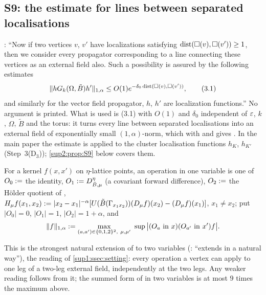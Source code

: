 
\subsection{S9: the estimate \cite[(3.1)]{Ba3} for lines between separated localisations}\label{sup2:ssec:S9}

\cite[p.~432]{Ba3}: ``Now if two vertices $v$, $v'$ have localizations satisfying $\operatorname{dist}(\square(v),\square(v'))\ge1$, then we consider every propagator corresponding to a line connecting these vertices as an external field also. Such a possibility is assured by the following estimates
\[
\lVert hG_k(\Omega,\tilde B)h'\rVert_{1,\alpha}\le O(1)e^{-\delta_0\operatorname{dist}(\square(v),\square(v'))},\tag{3.1}
\]
and similarly for the vector field propagator, $h$, $h'$ are localization functions.'' No argument is printed. What is used is (3.1) with $O(1)$ and $\delta_0$ independent of $\varepsilon$, $k$, $\Omega$, $\tilde B$ and the torus: it turns every line between separated localisations into an external field of exponentially small $(1,\alpha)$-norm, which with \cite[(2.5)]{Ba3} and \cite[(3.2)]{Ba3} gives \cite[(1.33)]{Ba3}. In the main paper the estimate is applied to the cluster localisation functions $h_K$, $h_{K'}$ (Step~3(D$_3$)); \cref{sup2:prop:S9} below covers them.

\begin{definition}\label{sup2:def:S9norm}
For a kernel $f(x,x')$ on $\eta$-lattice points, an operation in one variable is one of $O_0:=$ the identity, $O_1:= D^\eta_{\tilde B,\mu}$ (a covariant forward difference), $O_2:=$ the H\"older quotient of \cite[(1.32)]{Ba3}, $H_\mu f(x_1,x_2):=|x_2-x_1|^{-\alpha}[U(\tilde B(\Gamma_{x_1x_2}))(D_\mu f)(x_2)-(D_\mu f)(x_1)]$, $x_1\ne x_2$; put $|O_0|=0$, $|O_1|=1$, $|O_2|=1+\alpha$, and
\[
\norm f_{1,\alpha}\defeq\max_{(a,a')\in\{0,1,2\}^2,\ \mu,\mu'}\ \sup\big|(O_a\text{ in }x)(O_{a'}\text{ in }x')f\big|.
\]
\end{definition}

This is the strongest natural extension of \cite[(1.32)]{Ba3} to two variables (\cite[p.~420]{Ba3}: ``extends in a natural way''), the reading of \cref{sup1:ssec:setting}: every operation a vertex can apply to one leg of a two-leg external field, independently at the two legs. Any weaker reading follows from it; the summed form of \cite[(1.32)]{Ba3} in two variables is at most $9$ times the maximum above.

